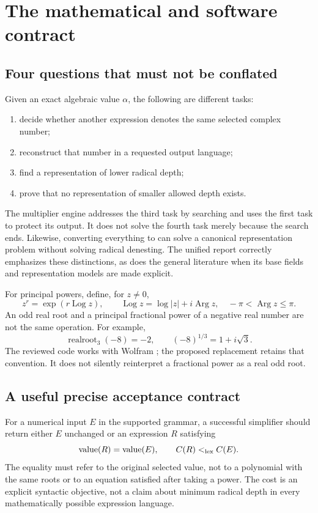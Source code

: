 \documentclass[11pt,letterpaper]{article}
\newcommand{\code}[1]{\texttt{\detokenize{#1}}}
\DeclareMathOperator{\Arg}{Arg}
\theoremstyle{definition}
\theoremstyle{remark}
\begin{document}
\section{The mathematical and software contract}\label{sec:contract}

\subsection{Four questions that must not be conflated}

Given an exact algebraic value $\alpha$, the following are different tasks:
\begin{enumerate}[label=(\roman*)]
\item decide whether another expression denotes the same selected complex number;
\item reconstruct that number in a requested output language;
\item find a representation of lower radical depth;
\item prove that no representation of smaller allowed depth exists.
\end{enumerate}
The multiplier engine addresses the third task by searching and uses the first task to protect its output. It does not solve the fourth task merely because the search ends. Likewise, converting everything to \code{Root} can solve a canonical representation problem without solving radical denesting. The unified report correctly emphasizes these distinctions, as does the general literature when its base fields and representation models are made explicit.\cite{report,landau,jeffrey}

For principal powers, define, for $z\ne0$,
\[
z^r=\exp(r\operatorname{Log}z),\qquad
\operatorname{Log}z=\log|z|+i\Arg z,\quad -\pi<\Arg z\le\pi.
\]
An odd real root and a principal fractional power of a negative real number are not the same operation. For example,
\[
\operatorname{realroot}_3(-8)=-2,
\qquad (-8)^{1/3}=1+i\sqrt3.
\]
The reviewed code works with Wolfram \code{Power}; the proposed replacement retains that convention. It does not silently reinterpret a fractional power as a real odd root.

\subsection{A useful precise acceptance contract}

For a numerical input $E$ in the supported grammar, a successful simplifier should return either $E$ unchanged or an expression $R$ satisfying
\begin{equation}\label{eq:acceptance}
\operatorname{value}(R)=\operatorname{value}(E),\qquad C(R)<_{\rm lex}C(E).
\end{equation}
The equality must refer to the original selected value, not to a polynomial with the same roots or to an equation satisfied after taking a power. The cost is an explicit syntactic objective, not a claim about minimum radical depth in every mathematically possible expression language.
\end{document}
